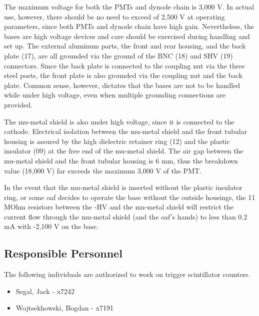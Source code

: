 \documentclass[12pt]{article}
\begin{document}
   The maximum voltage for both the PMTs and dynode chain is 3,000 V. In actual 
use, however, there should be no need to exceed of 2,500 V at operating 
parameters, since both PMTs and dynode chain have high gain. Nevertheless, the 
bases are high voltage devices and care should be exercised during handling and 
set up. The external aluminum parts, the front and rear housing, and the back 
plate (17), are all grounded via the ground of the BNC (18) and SHV (19) 
connectors. Since the back plate is connected to the coupling nut via the three 
steel posts, the front plate is also grounded via the coupling nut and the back 
plate. Common sense, however, dictates that the bases are not to be handled     
while under high voltage, even when multiple grounding connections are provided.

The mu-metal shield is also under high voltage, since it is connected to the 
cathode. Electrical isolation between the mu-metal shield and the front 
tubular housing is assured by the high dielectric retainer ring (12) and the 
plastic insulator (09) at the free end of the mu-metal shield. The air gap 
between the mu-metal shield and the front tubular housing is 6 mm, thus the 
breakdown value (18,000 V) far exceeds the maximum 3,000 V of the PMT.

In the event that the mu-metal shield is inserted without the plastic insulator 
ring, or some oaf decides to operate the base without the outside housings, the 
11 MOhm resistors between the -HV and the mu-metal shield will restrict the 
current flow through the mu-metal shield (and the oaf's hands) to less than 0.2 
mA with -2,100 V on the base. 

\subsection{Responsible Personnel} 
The following individuals are authorized to work on trigger scintillator counters. 
\begin{itemize}
\item[~]Segal, Jack - x7242 
\item[~]Wojtsekhowski, Bogdan - x7191 
\end{itemize} 
\end{document}

